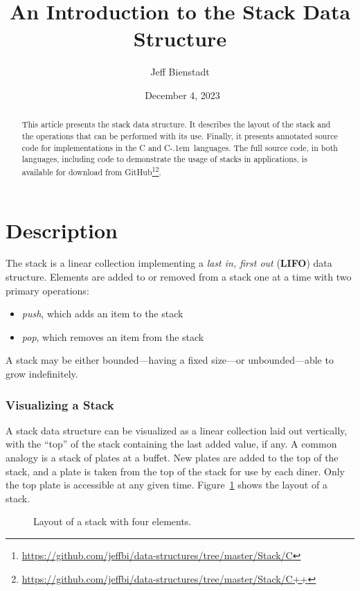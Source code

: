 \documentclass{article}
\newcommand{\Cpp}{\mbox{C\kern-.1em\raisebox{.35ex}{\smaller{\smaller{+\kern-0.05em+}}}}}
\begin{document}
  \title{An Introduction to the Stack Data Structure}
  \author{Jeff Bienstadt}
  \date{\textcopyright\ December 4, 2023}
  \maketitle
  \begin{abstract}
    This article presents the stack data structure. It describes the layout of the stack and the operations that can be performed with its use. Finally, it presents annotated source code for implementations in the C and \Cpp\ languages. The full source code, in both languages, including code to demonstrate the usage of stacks in applications, is available for download from GitHub\footnote{\url{https://github.com/jeffbi/data-structures/tree/master/Stack/C}}\footnote{\url{https://github.com/jeffbi/data-structures/tree/master/Stack/C++}}.
  \end{abstract}
  \part{Description}\label{part:description}
  The stack is a linear collection implementing a \emph{last in, first out} (\textbf{LIFO}) data structure. Elements are added to or removed from a stack one at a time with two primary operations:
  \begin{itemize}
    \item \emph{push}, which adds an item to the stack
    \item \emph{pop}, which removes an item from the stack
  \end{itemize}
  A stack may be either bounded---having a fixed size---or unbounded---able to grow indefinitely.

  \section{Visualizing a Stack}
  A stack data structure can be visualized as a linear collection laid out vertically, with the ``top'' of the stack containing the last added value, if any. A common analogy is a stack of plates at a buffet. New plates are added to the top of the stack, and a plate is taken from the top of the stack for use by each diner. Only the top plate is accessible at any given time.
  Figure~\ref{fig:basicstack} shows the layout of a stack.
  \begin{figure}[h]
    \centering
    \caption{Layout of a stack with four elements.}
    \label{fig:basicstack}
  \end{figure}
\end{document}
